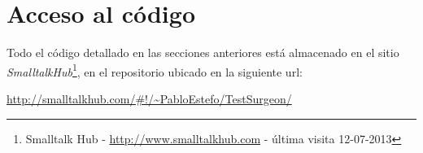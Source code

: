 \section{Acceso al código}
\par Todo el código detallado en las secciones anteriores está almacenado en el sitio \emph{SmalltalkHub}\footnote{Smalltalk Hub - \url{http://www.smalltalkhub.com} - última visita 12-07-2013 }, en el repositorio ubicado en la siguiente url: 
\begin{center}
\url{http://smalltalkhub.com/\#!/~PabloEstefo/TestSurgeon/}
\end{center}
